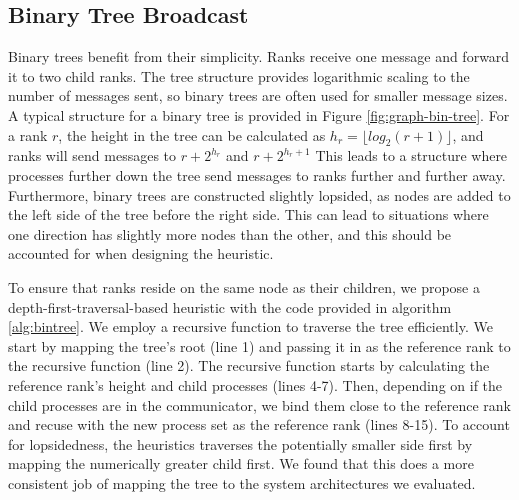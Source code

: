 


\subsection{Binary Tree Broadcast}
Binary trees benefit from their simplicity.
Ranks receive one message and forward it to two child ranks.
The tree structure provides logarithmic scaling to the number of messages sent, so binary trees are often used for smaller message sizes. 
A typical structure for a binary tree is provided in Figure \ref{fig:graph-bin-tree}.
For a rank $r$, the height in the tree can be calculated as $h_r = \lfloor log_2(r+1) \rfloor$, and ranks will send messages to $r + 2^{h_r}$ and $r + 2^{h_r + 1}$
This leads to a structure where processes further down the tree send messages to ranks further and further away.
Furthermore, binary trees are constructed slightly lopsided,  as nodes are added to the left side of the tree before the right side. 
This can lead to situations where one direction has slightly more nodes than the other, and this should be accounted for when designing the heuristic.

To ensure that ranks reside on the same node as their children, we propose a depth-first-traversal-based heuristic with the code provided in algorithm \ref{alg:bintree}.
We employ a recursive function to traverse the tree efficiently. 
We start by mapping the tree's root (line 1) and passing it in as the reference rank to the recursive function (line 2).
The recursive function starts by calculating the reference rank's height and child processes (lines 4-7). 
Then, depending on if the child processes are in the communicator, we bind them close to the reference rank and recuse with the new process set as the reference rank (lines 8-15).
To account for lopsidedness, the heuristics traverses the potentially smaller side first by mapping the numerically greater child first.
We found that this does a more consistent job of mapping the tree to the system architectures we evaluated.




